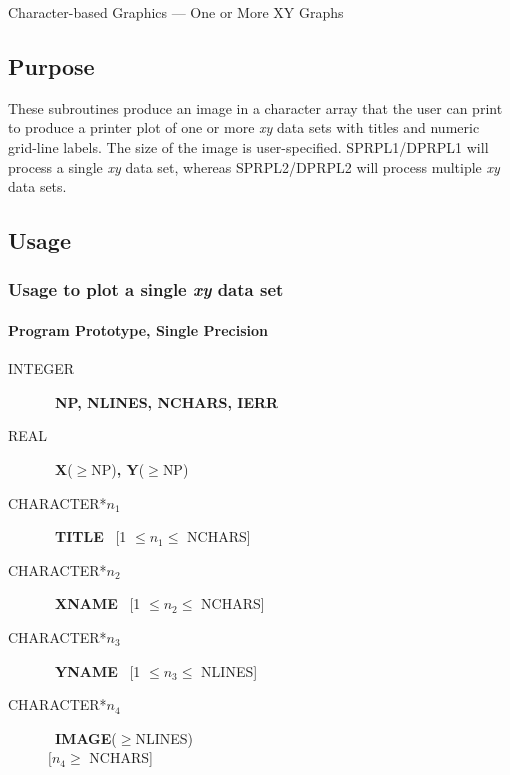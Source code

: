 \documentclass[twoside]{MATH77}
\begin{document}
  Character-based Graphics --- One or More XY Graphs


\subsection{Purpose}

These subroutines produce an image in a character array that the user can
print to produce a printer plot of one or more {\em xy} data sets with
titles and numeric grid-line labels. The size of the image is user-specified.
SPRPL1/DPRPL1 will process a single {\em xy} data set, whereas SPRPL2/DPRPL2
will process multiple {\em xy} data sets.

\subsection{Usage}

\subsubsection{Usage to plot a single {\em xy} data set}

\paragraph{Program Prototype, Single Precision}

\begin{description}

\item[INTEGER] \ {\bf NP, NLINES, NCHARS, IERR}

\item[REAL] \ {\bf X}($\geq $NP){\bf , Y}($\geq $NP)

\item[CHARACTER*$n_1$] \ {\bf TITLE} \ [1 $\leq  n_1 \leq $ NCHARS]

\item[CHARACTER*$n_2$] \ {\bf XNAME} \ [1 $\leq n_2 \leq $ NCHARS]

\item[CHARACTER*$n_3$] \ {\bf YNAME} \ [1 $\leq n_3 \leq $ NLINES]

\item[CHARACTER*$n_4$] \ {\bf IMAGE}($\geq $NLINES)\\ $[n_4 \geq $ NCHARS]

\end{description}
\end{document}
